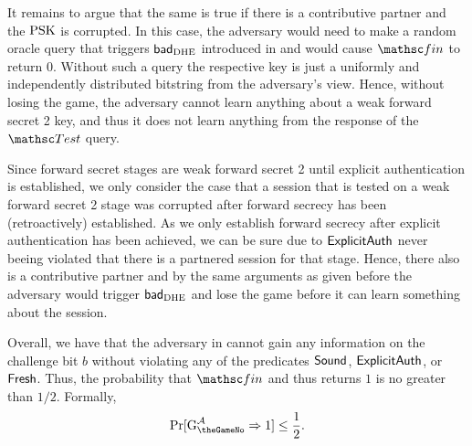 	It remains to argue that the same is true if there is a contributive partner and the $\mathrm{PSK}$ is corrupted. 
	In this case, the adversary would need to make a random oracle query that triggers $\mathsf{bad}_{\mathrm{DHE}}$ introduced in  and would cause $\Finalize$ to return $0$.
	Without such a query the respective key is just a uniformly and independently distributed bitstring from the adversary's view.
	Hence, without losing the game, the adversary cannot learn anything about a weak forward secret 2 key, and thus it does not learn anything from the response of the $\Test$ query.
	
	Since forward secret stages are weak forward secret 2 until explicit authentication is established, we only consider the case that a session that is tested on a weak forward secret 2 stage was corrupted after forward secrecy has been (retroactively) established.
	As we only establish forward secrecy after explicit authentication has been achieved, we can be sure due to $\mathsf{ExplicitAuth}$ never beeing violated that there is a partnered session for that stage.
	Hence, there also is a contributive partner and by the same arguments as given before the adversary would trigger $\mathsf{bad}_{\mathrm{DHE}}$ and lose the game before it can learn something about the session.
	
	Overall, we have that the adversary in \thisGame cannot gain any information on the challenge bit $b$ without violating any of the predicates $\mathsf{Sound}$, $\mathsf{ExplicitAuth}$, or $\mathsf{Fresh}$. Thus, the probability that $\Finalize$ and thus \thisGame returns $1$ is no greater than $1/2$. Formally,
	\[
		\Pr[ \thisGameMath \outputs 1 ] \leq \frac 12.
	\]
	
